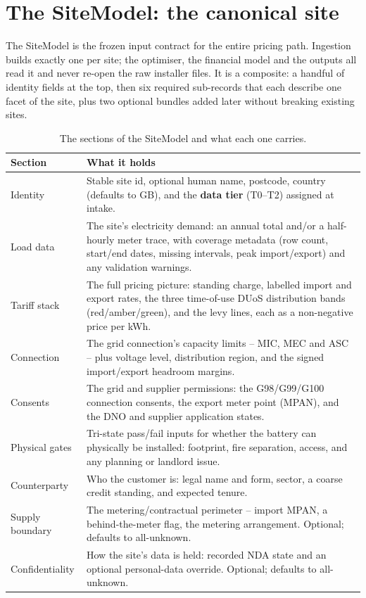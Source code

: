\section{The SiteModel: the canonical site}

The SiteModel is the frozen input contract for the entire pricing path. Ingestion builds exactly one per site; the optimiser, the financial model and the outputs all read it and never re-open the raw installer files. It is a composite: a handful of identity fields at the top, then six required sub-records that each describe one facet of the site, plus two optional bundles added later without breaking existing sites.

\begin{table}[H]
\centering
\caption{The sections of the SiteModel and what each one carries.}
\label{tab:sitemodel}
\small\sffamily
\begin{tabularx}{\textwidth}{@{}l L@{}}
\toprule
\textbf{Section} & \textbf{What it holds} \\
\midrule
Identity & Stable site id, optional human name, postcode, country (defaults to GB), and the \textbf{data tier} (T0--T2) assigned at intake. \\
Load data & The site's electricity demand: an annual total and/or a half-hourly meter trace, with coverage metadata (row count, start/end dates, missing intervals, peak import/export) and any validation warnings. \\
Tariff stack & The full pricing picture: standing charge, labelled import and export rates, the three time-of-use DUoS distribution bands (red/amber/green), and the levy lines, each as a non-negative price per kWh. \\
Connection & The grid connection's capacity limits -- MIC, MEC and ASC -- plus voltage level, distribution region, and the signed import/export headroom margins. \\
Consents & The grid and supplier permissions: the G98/G99/G100 connection consents, the export meter point (MPAN), and the DNO and supplier application states. \\
Physical gates & Tri-state pass/fail inputs for whether the battery can physically be installed: footprint, fire separation, access, and any planning or landlord issue. \\
Counterparty & Who the customer is: legal name and form, sector, a coarse credit standing, and expected tenure. \\
Supply boundary & The metering/contractual perimeter -- import MPAN, a behind-the-meter flag, the metering arrangement. Optional; defaults to all-unknown. \\
Confidentiality & How the site's data is held: recorded NDA state and an optional personal-data override. Optional; defaults to all-unknown. \\
\bottomrule
\end{tabularx}
\end{table}

